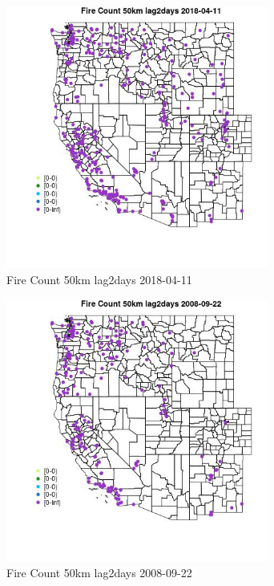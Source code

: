 \begin{figure} 
\centering  
\includegraphics[width=0.77\textwidth]{Code_Outputs/Report_ML_input_PM25_Step4_part_e_de_duplicated_aves_compiled_2019-05-18wNAs_MapObsFire_Count_50km_lag2days2018-04-11.jpg} 
\caption{\label{fig:Report_ML_input_PM25_Step4_part_e_de_duplicated_aves_compiled_2019-05-18wNAsMapObsFire_Count_50km_lag2days2018-04-11}Fire Count 50km lag2days 2018-04-11} 
\end{figure} 
 

\begin{figure} 
\centering  
\includegraphics[width=0.77\textwidth]{Code_Outputs/Report_ML_input_PM25_Step4_part_e_de_duplicated_aves_compiled_2019-05-18wNAs_MapObsFire_Count_50km_lag2days2008-09-22.jpg} 
\caption{\label{fig:Report_ML_input_PM25_Step4_part_e_de_duplicated_aves_compiled_2019-05-18wNAsMapObsFire_Count_50km_lag2days2008-09-22}Fire Count 50km lag2days 2008-09-22} 
\end{figure} 
 

